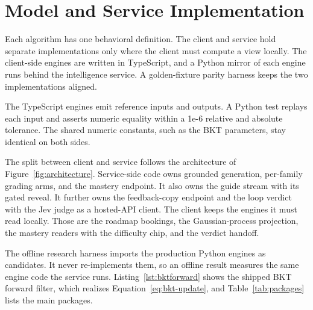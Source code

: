 \section{Model and Service Implementation}
Each algorithm has one behavioral definition. The client and service hold separate implementations only where the client must compute a view locally. The client-side engines are written in TypeScript, and a Python mirror of each engine runs behind the intelligence service. A golden-fixture parity harness keeps the two implementations aligned.

The TypeScript engines emit reference inputs and outputs. A Python test replays each input and asserts numeric equality within a 1e-6 relative and absolute tolerance. The shared numeric constants, such as the BKT parameters, stay identical on both sides.

The split between client and service follows the architecture of Figure~\ref{fig:architecture}. Service-side code owns grounded generation, per-family grading arms, and the mastery endpoint. It also owns the guide stream with its gated reveal. It further owns the feedback-copy endpoint and the loop verdict with the Jev judge as a hosted-API client. The client keeps the engines it must read locally. Those are the roadmap bookings, the Gaussian-process projection, the mastery readers with the difficulty chip, and the verdict handoff.

The offline research harness imports the production Python engines as candidates. It never re-implements them, so an offline result measures the same engine code the service runs. Listing~\ref{lst:bktforward} shows the shipped BKT forward filter, which realizes Equation~\ref{eq:bkt-update}, and Table~\ref{tab:packages} lists the main packages.

